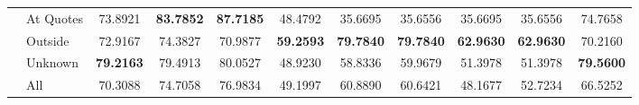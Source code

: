 \begin{table}
\begin{tabular}{llSSSSSSSSS}
 & At Quotes & 73.8921 & \bfseries 83.7852 & \bfseries 87.7185 & 48.4792 & 35.6695 & 35.6556 & 35.6695 & 35.6556 & 74.7658 \\
 & Outside & 72.9167 & 74.3827 & 70.9877 & \bfseries 59.2593 & \bfseries 79.7840 & \bfseries 79.7840 & \bfseries 62.9630 & \bfseries 62.9630 & 70.2160 \\
 & Unknown & \bfseries 79.2163 & 79.4913 & 80.0527 & 48.9230 & 58.8336 & 59.9679 & 51.3978 & 51.3978 & \bfseries 79.5600 \\
 & All & 70.3088 & 74.7058 & 76.9834 & 49.1997 & 60.8890 & 60.6421 & 48.1677 & 52.7234 & 66.5252 \\
\bottomrule
\end{tabular}
\end{table}
